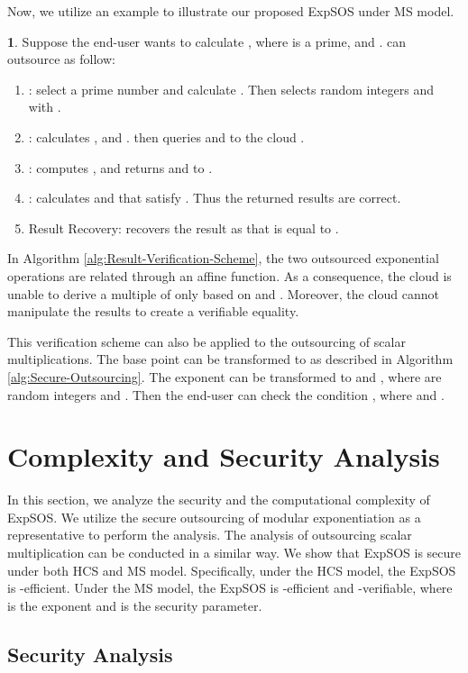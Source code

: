 \documentclass[english,draftcls,onecolumn,11pt]{IEEEtran}
\theoremstyle{definition}
\theoremstyle{plain}
\theoremstyle{plain}
\theoremstyle{definition}
\newtheorem{example}{\protect\examplename}
\providecommand{\examplename}{Example}
\begin{document}
Now, we utilize an example to illustrate our proposed ExpSOS under
MS model.
\begin{example}
Suppose the end-user  wants to calculate , where
 is a prime,  and .  can outsource 
as follow:\end{example}
\begin{enumerate}
\item :  select a prime number  and
calculate . Then  selects random integers 
and  with .
\item :  calculates ,
 and .
 then queries  and 
to the cloud .
\item :  computes ,
 and returns
 and  to .
\item :  calculates 
and  that satisfy .
Thus the returned results are correct.
\item Result Recovery:  recovers the result as 
that is equal to .
\end{enumerate}
In Algorithm \ref{alg:Result-Verification-Scheme}, the two outsourced
exponential operations are related through an affine function. As
a consequence, the cloud is unable to derive a multiple of 
only based on  and . Moreover, the cloud cannot manipulate
the results to create a verifiable equality. 

This verification scheme can also be applied to the outsourcing of
scalar multiplications. The base point  can be transformed to
 as described in Algorithm \ref{alg:Secure-Outsourcing}.
The exponent  can be transformed to  and ,
where  are random integers and .
Then the end-user can check the condition ,
where  and . 


\section{Complexity and Security Analysis \label{sec:Complexity-and-Security}}

In this section, we analyze the security and the computational complexity
of ExpSOS. We utilize the secure outsourcing of modular exponentiation
as a representative to perform the analysis. The analysis of outsourcing
scalar multiplication can be conducted in a similar way. We show that
ExpSOS is secure under both HCS and MS model. Specifically, under
the HCS model, the ExpSOS is -efficient. Under
the MS model, the ExpSOS is -efficient and
-verifiable, where  is the exponent and
 is the security parameter.


\subsection{Security Analysis}
\end{document}
